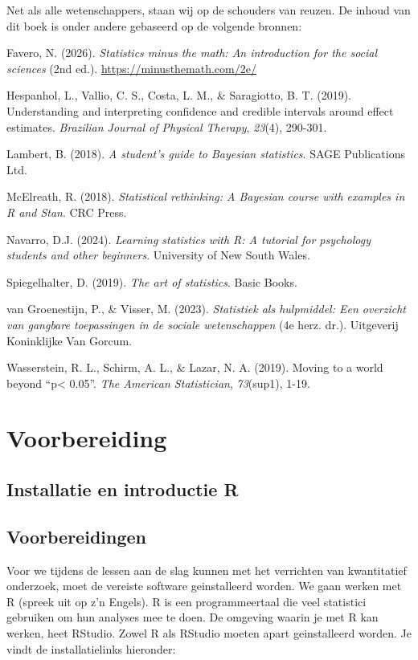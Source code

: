 \documentclass[
  letterpaper,
  DIV=11,
  numbers=noendperiod]{scrreprt}
\begin{document}
Net als alle wetenschappers, staan wij op de schouders van reuzen. De
inhoud van dit boek is onder andere gebaseerd op de volgende bronnen:

Favero, N. (2026). \emph{Statistics minus the math: An introduction for
the social sciences} (2nd ed.). \url{https://minusthemath.com/2e/}

Hespanhol, L., Vallio, C. S., Costa, L. M., \& Saragiotto, B. T. (2019).
Understanding and interpreting confidence and credible intervals around
effect estimates. \emph{Brazilian Journal of Physical Therapy},
\emph{23}(4), 290-301.

Lambert, B. (2018). \emph{A student's guide to Bayesian statistics}.
SAGE Publications Ltd.

McElreath, R. (2018). \emph{Statistical rethinking: A Bayesian course
with examples in R and Stan}. CRC Press.

Navarro, D.J. (2024). \emph{Learning statistics with R: A tutorial for
psychology students and other beginners}. University of New South Wales.

Spiegelhalter, D. (2019). \emph{The art of statistics}. Basic Books.

van Groenestijn, P., \& Visser, M. (2023). \emph{Statistiek als
hulpmiddel: Een overzicht van gangbare toepassingen in de sociale
wetenschappen} (4e herz. dr.). Uitgeverij Koninklijke Van Gorcum.

Wasserstein, R. L., Schirm, A. L., \& Lazar, N. A. (2019). Moving to a
world beyond ``p\textless{} 0.05''. \emph{The American Statistician},
\emph{73}(sup1), 1-19.

\part{Voorbereiding}

\chapter{Installatie en introductie
R}\label{installatie-en-introductie-r}

\chapter*{Voorbereidingen}\label{voorbereidingen}


Voor we tijdens de lessen aan de slag kunnen met het verrichten van
kwantitatief onderzoek, moet de vereiste software geinstalleerd worden.
We gaan werken met R (spreek uit op z'n Engels). R is een
programmeertaal die veel statistici gebruiken om hun analyses mee te
doen. De omgeving waarin je met R kan werken, heet RStudio. Zowel R als
RStudio moeten apart geinstalleerd worden. Je vindt de installatielinks
hieronder:
\end{document}

